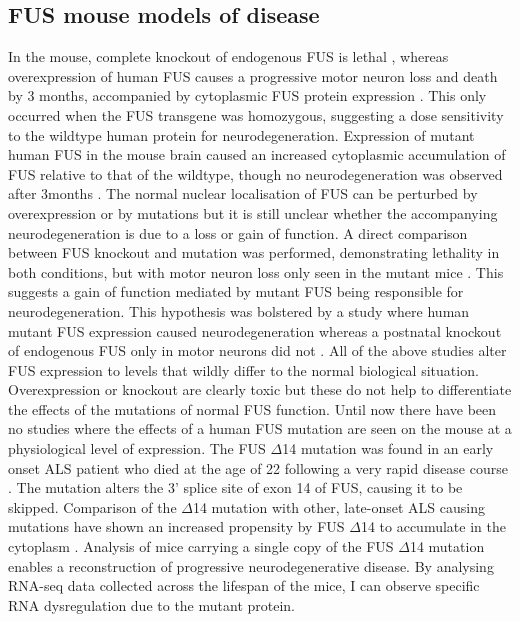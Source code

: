 \subsection{ FUS mouse models of disease } 

In the mouse, complete knockout of endogenous FUS is lethal \citep{Hicks2000}, whereas overexpression of human FUS causes a progressive motor neuron loss and death by 3 months, accompanied by cytoplasmic FUS protein expression \citep{Mitchell2013}. This only occurred when the FUS transgene was homozygous, suggesting a dose sensitivity to the wildtype human protein for neurodegeneration. Expression of mutant human FUS in the mouse brain caused an increased cytoplasmic accumulation of FUS relative to that of the wildtype, though no neurodegeneration was observed after 3months \citep{Verbeeck2012}. 
The normal nuclear localisation of FUS can be perturbed by overexpression or by mutations but it is still unclear whether the accompanying neurodegeneration is due to a loss or gain of function. A direct comparison between FUS knockout and mutation was performed, demonstrating lethality in both conditions, but with motor neuron loss only seen in the mutant mice \citep{Scekic-zahirovic2016}. This suggests a gain of function mediated by mutant FUS being responsible for neurodegeneration. This hypothesis was bolstered by a study where human mutant FUS expression caused neurodegeneration whereas a postnatal knockout of endogenous FUS only in motor neurons did not \citep{Sharma2016}. 
All of the above studies alter FUS expression to levels that wildly differ to the normal biological situation. Overexpression or knockout are clearly toxic but these do not help to differentiate the effects of the mutations of normal FUS function. Until now there have been no studies where the effects of a human FUS mutation are seen on the mouse at a physiological level of expression. 
The FUS $\Delta$14 mutation was found in an early onset ALS patient who died at the age of 22 following a very rapid disease course \citep{DeJesus-Hernandez2010}. The mutation alters the 3' splice site of exon 14 of FUS, causing it to be skipped.  Comparison of the $\Delta$14 mutation with other, late-onset ALS causing mutations have shown an increased propensity by FUS $\Delta$14 to accumulate in the cytoplasm \citep{Verbeeck2012}. Analysis of mice carrying a single copy of the FUS $\Delta$14 mutation enables a reconstruction of progressive neurodegenerative disease. By analysing RNA-seq data collected across the lifespan of the mice, I can observe specific RNA dysregulation due to the mutant protein.

